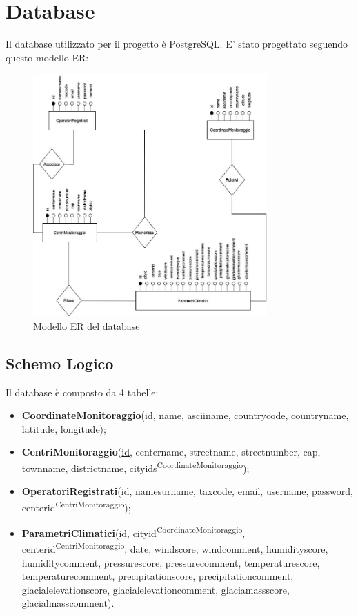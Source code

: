 \section{Database}
Il database utilizzato per il progetto è PostgreSQL. E' stato progettato seguendo questo modello ER:

\begin{figure}[H]
    \centering
    \includegraphics[width=0.8\textwidth]{img/Schema_ER.jpg}
    \caption{Modello ER del database}
    \label{fig:ER}
\end{figure}

\subsection{Schemo Logico}
Il database è composto da 4 tabelle:
\begin{itemize}
    \item \textbf{CoordinateMonitoraggio}(\underline{id}, name, asciiname, countrycode, countryname, latitude, longitude);
    \item \textbf{CentriMonitoraggio}(\underline{id}, centername, streetname, streetnumber, cap, townname, districtname, cityids\textsuperscript{CoordinateMonitoraggio});
    \item \textbf{OperatoriRegistrati}(\underline{id}, namesurname, taxcode, email, username, password, centerid\textsuperscript{CentriMonitoraggio});
    \item \textbf{ParametriClimatici}(\underline{id}, cityid\textsuperscript{CoordinateMonitoraggio}, centerid\textsuperscript{CentriMonitoraggio}, date, windscore, windcomment, humidityscore, humiditycomment, pressurescore, pressurecomment, temperaturescore, temperaturecomment, precipitationscore, precipitationcomment, glacialelevationscore, glacialelevationcomment, glaciamassscore, glacialmasscomment).
\end{itemize}

